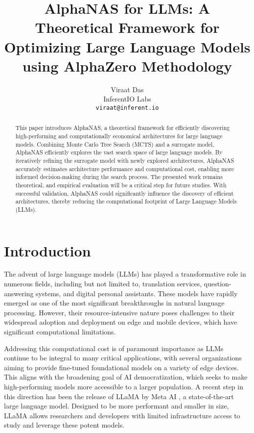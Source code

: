 \documentclass{article}
\title{AlphaNAS for LLMs: A Theoretical Framework for Optimizing Large Language Models using AlphaZero Methodology
}
\author{
  Viraat Das \\
  InferentIO Labs \\
  \texttt{viraat@inferent.io} \\
}
\begin{document}
\maketitle



\begin{abstract}
This paper introduces AlphaNAS, a theoretical framework for efficiently discovering high-performing and computationally economical architectures for large language models. Combining Monte Carlo Tree Search (MCTS) and a surrogate model, AlphaNAS efficiently explores the vast search space of large language models. By iteratively refining the surrogate model with newly explored architectures, AlphaNAS accurately estimates architecture performance and computational cost, enabling more informed decision-making during the search process. The presented work remains theoretical, and empirical evaluation will be a critical step for future studies. With successful validation, AlphaNAS could significantly influence the discovery of efficient architectures, thereby reducing the computational footprint of Large Language Models (LLMs).
\end{abstract}


\section{Introduction}
The advent of large language models (LLMs) has played a transformative role in numerous fields, including but not limited to, translation services, question-answering systems, and digital personal assistants. These models have rapidly emerged as one of the most significant breakthroughs in natural language processing. However, their resource-intensive nature poses challenges to their widespread adoption and deployment on edge and mobile devices, which have significant computational limitations.

Addressing this computational cost is of paramount importance as LLMs continue to be integral to many critical applications, with several organizations aiming to provide fine-tuned foundational models on a variety of edge devices. This aligns with the broadening goal of AI democratization, which seeks to make high-performing models more accessible to a larger population. A recent step in this direction has been the release of LLaMA by Meta AI \cite{touvron2023llama}, a state-of-the-art large language model. Designed to be more performant and smaller in size, LLaMA allows researchers and developers with limited infrastructure access to study and leverage these potent models.
\end{document}
